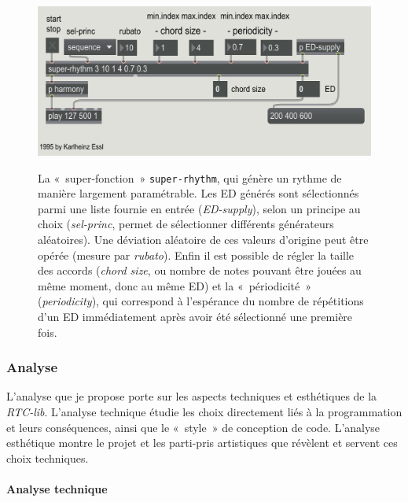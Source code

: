 \documentclass[a4paper,12pt]{article}
\newcommand{\guill}[1]{«~#1~»}
\begin{document}
\begin{figure}[h!]
\begin{center}
\includegraphics[width=\textwidth]{images/superrhythm.png}
\label{superrhythm}
\caption{\footnotesize La \guill{super-fonction} \texttt{super-rhythm}, qui génère un rythme de manière largement paramétrable. Les ED générés sont sélectionnés parmi une liste fournie en entrée (\emph{ED-supply}), selon un principe au choix (\emph{sel-princ}, permet de sélectionner différents générateurs aléatoires). Une déviation aléatoire de ces valeurs d'origine peut être opérée (mesure par \emph{rubato}). Enfin il est possible de régler la taille des accords (\emph{chord size}, ou nombre de notes pouvant être jouées au même moment, donc au même ED) et la \guill{périodicité} (\emph{periodicity}), qui correspond à l'espérance du nombre de répétitions d'un ED immédiatement après avoir été sélectionné une première fois.}
\end{center}
\end{figure}


\subsubsection{Analyse}

L'analyse que je propose porte sur les aspects techniques et esthétiques de la \emph{RTC-lib}. L'analyse technique étudie les choix directement liés à la programmation et leurs conséquences, ainsi que le \guill{style} de conception de code. L'analyse esthétique montre le projet et les parti-pris artistiques que révèlent et servent ces choix techniques.

\paragraph{Analyse technique \\}
\end{document}
